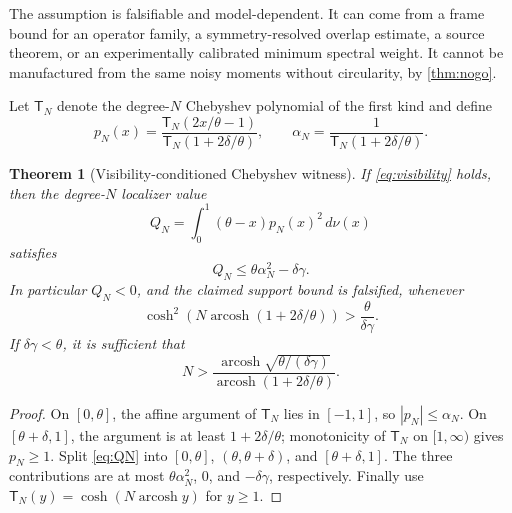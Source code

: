 \documentclass[11pt]{article}
\newtheorem{theorem}{Theorem}[section]
\theoremstyle{definition}
\theoremstyle{remark}
\begin{document}
The assumption is falsifiable and model-dependent.  It can come from a frame
bound for an operator family, a symmetry-resolved overlap estimate, a source
theorem, or an experimentally calibrated minimum spectral weight.  It cannot
be manufactured from the same noisy moments without circularity, by
\cref{thm:nogo}.

Let $\mathsf T_N$ denote the degree-$N$ Chebyshev polynomial of the first kind
and define
\begin{equation}
 p_N(x)=
 \frac{\mathsf T_N(2x/\theta-1)}
 {\mathsf T_N(1+2\delta/\theta)},
 \qquad
 \alpha_N=\frac1{\mathsf T_N(1+2\delta/\theta)}.       \label{eq:chebfilter}
\end{equation}

\begin{theorem}[Visibility-conditioned Chebyshev witness] \label{thm:cheb}
If \cref{eq:visibility} holds, then the degree-$N$ localizer value
\begin{equation}
 Q_N=\int_0^1(\theta-x)p_N(x)^2\,d\nu(x)              \label{eq:QN}
\end{equation}
satisfies
\begin{equation}
 Q_N\leq \theta\alpha_N^2-\delta\gamma.               \label{eq:Qbound}
\end{equation}
In particular $Q_N<0$, and the claimed support bound is falsified, whenever
\begin{equation}
 \cosh^2\!\left(N\operatorname{arcosh}
 (1+2\delta/\theta)\right)>
 \frac{\theta}{\delta\gamma}.                         \label{eq:depth}
\end{equation}
If $\delta\gamma<\theta$, it is sufficient that
\begin{equation}
 N>
 \frac{\operatorname{arcosh}\sqrt{\theta/(\delta\gamma)}}
 {\operatorname{arcosh}(1+2\delta/\theta)}.            \label{eq:Nexplicit}
\end{equation}
\end{theorem}

\begin{proof}
On $[0,\theta]$, the affine argument of $\mathsf T_N$ lies in $[-1,1]$,
so $|p_N|\leq\alpha_N$.  On $[\theta+\delta,1]$, the argument is at least
$1+2\delta/\theta$; monotonicity of $\mathsf T_N$ on $[1,\infty)$ gives
$p_N\geq1$.  Split \cref{eq:QN} into
$[0,\theta]$, $(\theta,\theta+\delta)$, and
$[\theta+\delta,1]$.  The three contributions are at most
$\theta\alpha_N^2$, $0$, and $-\delta\gamma$, respectively.  Finally use
$\mathsf T_N(y)=\cosh(N\operatorname{arcosh}y)$ for $y\geq1$.
\end{proof}
\end{document}
